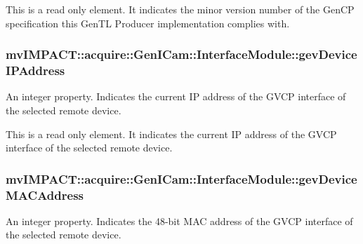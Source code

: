 This is a read only element. It indicates the minor version number of the Gen\+C\+P specification this Gen\+T\+L Producer implementation complies with. \hypertarget{classmv_i_m_p_a_c_t_1_1acquire_1_1_gen_i_cam_1_1_interface_module_ab8905756d4203a9e8ac90528899a67d1}{
\subsubsection[{gev\+Device\+I\+P\+Address}]{ mv\+I\+M\+P\+A\+C\+T\+::acquire\+::\+Gen\+I\+Cam\+::\+Interface\+Module\+::gev\+Device\+I\+P\+Address}}\label{classmv_i_m_p_a_c_t_1_1acquire_1_1_gen_i_cam_1_1_interface_module_ab8905756d4203a9e8ac90528899a67d1}


An integer property. Indicates the current I\+P address of the G\+V\+C\+P interface of the selected remote device. 

This is a read only element. It indicates the current I\+P address of the G\+V\+C\+P interface of the selected remote device. \hypertarget{classmv_i_m_p_a_c_t_1_1acquire_1_1_gen_i_cam_1_1_interface_module_a818081268a11698a5568ed40d8debe3b}{
\subsubsection[{gev\+Device\+M\+A\+C\+Address}]{ mv\+I\+M\+P\+A\+C\+T\+::acquire\+::\+Gen\+I\+Cam\+::\+Interface\+Module\+::gev\+Device\+M\+A\+C\+Address}}\label{classmv_i_m_p_a_c_t_1_1acquire_1_1_gen_i_cam_1_1_interface_module_a818081268a11698a5568ed40d8debe3b}


An integer property. Indicates the 48-\/bit M\+A\+C address of the G\+V\+C\+P interface of the selected remote device. 

